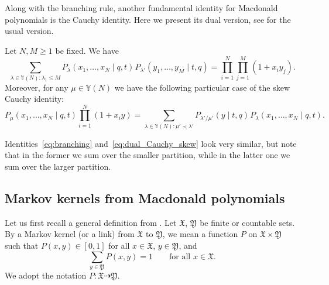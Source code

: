 Along with the branching rule, another fundamental
identity for Macdonald polynomials is the Cauchy identity.
Here we present its dual version, see \cite[Chapter~VI.4]{Macdonald1995} for the
usual version.

\begin{Proposition}
	\label{prop:dual_Cauchy_identity}
	Let $N,M\ge 1$ be fixed. We have
	\begin{equation*}%
		\sum_{\lambda\in \mathbb{Y}(N)\colon \lambda_1\le M}
		P_\lambda(x_1,\dots,x_N \mid q,t)
		\hspace{1pt}
		P_{\lambda'}(y_1,\dots,y_M\mid t,q )=
		\prod_{i=1}^{N}\prod_{j=1}^{M}(1+x_iy_j).
	\end{equation*}
	Moreover, for any $\mu\in \mathbb{Y}(N)$ we have
	the following particular case of
	the skew Cauchy identity:
	\begin{equation}		\label{eq:dual_Cauchy_skew}
		P_\mu(x_1,\dots,x_N\mid q,t )
		\prod_{i=1}^{N}(1+x_iy)=
		\sum_{\lambda\in \mathbb{Y}(N)\colon \mu'\prec \lambda'}
		P_{\lambda'/\mu'}(y\mid t,q)
		\hspace{1pt}
		P_\lambda(x_1,\dots,x_N\mid q,t ).
	\end{equation}
\end{Proposition}
Identities~\eqref{eq:branching} and~\eqref{eq:dual_Cauchy_skew} look very similar, but note that
in the former we sum over the smaller partition, while in the latter one we sum over the larger partition.

\subsection{Markov kernels from Macdonald polynomials}\label{eq:Markov_kernels_from_Cauchy}

Let us first recall a general definition from
\cite[Chapter~7]{borodin2016representations}.
Let $\mathfrak{X}$, $\mathfrak{Y}$ be
finite or countable sets. By a Markov kernel
(or a link) from $\mathfrak{X}$ to $\mathfrak{Y}$,
we mean a function $P$ on $\mathfrak{X}\times \mathfrak{Y}$
such that
$P(x,y)\in[0,1]$ for all $x\in \mathfrak{X}$, $y\in \mathfrak{Y}$,
and
\begin{equation*}
	\sum_{y\in \mathfrak{Y}}P(x,y)=1
	\qquad
	\text{for all $x\in \mathfrak{X}$}.
\end{equation*}
We adopt the notation $P\colon \mathfrak{X}\dashrightarrow \mathfrak{Y}$.

